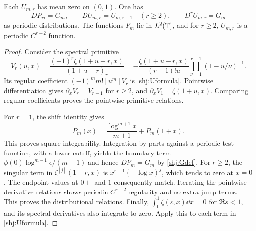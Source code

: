 \begin{lemma}\label{shj:Ulemma}
Each $U_{m,r}$ has mean zero on $(0,1)$. One has
\[
DP_m=G_m,\qquad DU_{m,r}=U_{m,r-1}\quad(r\ge2),\qquad D^rU_{m,r}=G_m
\]
as periodic distributions. The functions $P_m$ lie in $L^2(\mathbb T)$, and for $r\ge2$, $U_{m,r}$ is a periodic $C^{r-2}$ function.
\end{lemma}
\begin{proof}
Consider the spectral primitive
\begin{equation}\label{shj:primitivegenerator}
V_r(u,x)=\frac{(-1)^r\zeta(1+u-r,x)}{(1+u-r)_r}
=-\frac{\zeta(1+u-r,x)}{(r-1)!u}
\prod_{\nu=1}^{r-1}(1-u/\nu)^{-1}.
\end{equation}
Its regular coefficient $(-1)^m m![u^m]V_r$ is \eqref{shj:Uformula}. Pointwise differentiation gives $\partial_xV_r=V_{r-1}$ for $r\ge2$, and $\partial_xV_1=\zeta(1+u,x)$. Comparing regular coefficients proves the pointwise primitive relations.

For $r=1$, the shift identity gives
\[
P_m(x)=\frac{\log^{m+1}x}{m+1}+P_m(1+x).
\]
This proves square integrability. Integration by parts against a periodic test function, with a lower cutoff, yields the boundary term $\phi(0)\log^{m+1}\epsilon/(m+1)$ and hence $DP_m=G_m$ by \eqref{shj:Gdef}.
For $r\ge2$, the singular term in $\zeta^{[j]}(1-r,x)$ is $x^{r-1}(-\log x)^j$, which tends to zero at $x=0$. The endpoint values at $0+$ and $1$ consequently match. Iterating the pointwise derivative relations shows periodic $C^{r-2}$ regularity and no extra jump terms. This proves the distributional relations. Finally, $\int_0^1\zeta(s,x)\dd x=0$ for $\Re s<1$, and its spectral derivatives also integrate to zero. Apply this to each term in \eqref{shj:Uformula}.
\end{proof}

